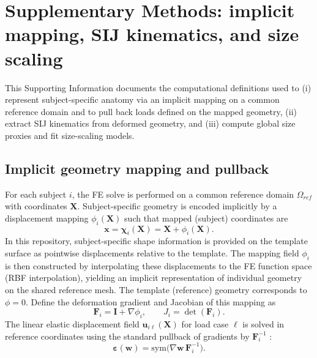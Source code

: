 \section{Supplementary Methods: implicit mapping, SIJ kinematics, and size scaling}

This Supporting Information documents the computational definitions used to (i) represent subject-specific anatomy via an implicit mapping on a common reference domain and to pull back loads defined on the mapped geometry, (ii) extract SIJ kinematics from deformed geometry, and (iii) compute global size proxies and fit size-scaling models.

\subsection{Implicit geometry mapping and pullback}
For each subject $i$, the FE solve is performed on a common reference domain $\Omega_{ref}$ with coordinates $\mathbf{X}$. Subject-specific geometry is encoded implicitly by a displacement mapping $\phi_i(\mathbf{X})$ such that mapped (subject) coordinates are
\begin{equation}
\mathbf{x}=\boldsymbol{\chi}_i(\mathbf{X})=\mathbf{X}+\phi_i(\mathbf{X}).
\end{equation}
In this repository, subject-specific shape information is provided on the template surface as pointwise displacements relative to the template. The mapping field $\phi_i$ is then constructed by interpolating these displacements to the FE function space (RBF interpolation), yielding an implicit representation of individual geometry on the shared reference mesh. The template (reference) geometry corresponds to $\phi=0$.
Define the deformation gradient and Jacobian of this mapping as
\begin{equation}
\mathbf{F}_i=\mathbf{I}+\nabla \phi_i,
\qquad
J_i=\det(\mathbf{F}_i).
\end{equation}
The linear elastic displacement field $\mathbf{u}_{i\ell}(\mathbf{X})$ for load case $\ell$ is solved in reference coordinates using the standard pullback of gradients by $\mathbf{F}_i^{-1}$ \citep{BonetWood1997}:
\begin{equation}
\boldsymbol{\varepsilon}(\mathbf{w})=\mathrm{sym}\big(\nabla \mathbf{w}\,\mathbf{F}_i^{-1}\big).
\end{equation}

